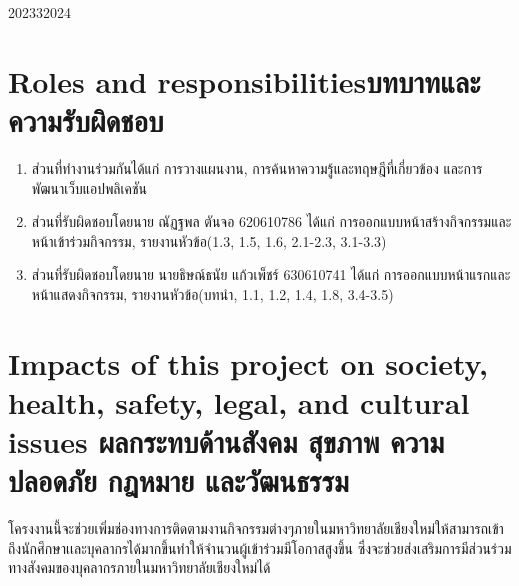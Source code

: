 \begin{plan}{6}{2023}{3}{2024}

\end{plan}

\section{\ifenglish Roles and responsibilities\else บทบาทและความรับผิดชอบ\fi}
\begin{enumerate}
    \item ส่วนที่ทำงานร่วมกันได้แก่ การวางแผนงาน, การค้นหาความรู้และทฤษฎีที่เกี่ยวข้อง และการพัฒนาเว็บแอปพลิเคชัน
    \item ส่วนที่รับผิดชอบโดยนาย ณัฏฐพล ตันจอ 620610786 ได้แก่ การออกแบบหน้าสร้างกิจกรรมและหน้าเข้าร่วมกิจกรรม, รายงานหัวข้อ(1.3, 1.5, 1.6, 2.1-2.3, 3.1-3.3) 
    \item ส่วนที่รับผิดชอบโดยนาย นายธิษณ์ธนัย แก้วเพ็ชร์ 630610741 ได้แก่ การออกแบบหน้าแรกและหน้าแสดงกิจกรรม, รายงานหัวข้อ(บทนำ, 1.1, 1.2, 1.4, 1.8, 3.4-3.5)
\end{enumerate}

\section{\ifenglish%
Impacts of this project on society, health, safety, legal, and cultural issues
\else%
ผลกระทบด้านสังคม สุขภาพ ความปลอดภัย กฎหมาย และวัฒนธรรม
\fi}

โครงงานนี้จะช่วยเพิ่มช่องทางการติดตามงานกิจกรรมต่างๆภายในมหาวิทยาลัยเชียงใหม่ให้สามารถเข้าถึงนักศึกษาเเละบุคลากรได้มากขึ้นทำให้จำนวนผู้เข้าร่วมมีโอกาสสูงขึ้น ซึ่งจะช่วยส่งเสริมการมีส่วนร่วมทางสังคมของบุคลากรภายในมหาวิทยาลัยเชียงใหม่ได้